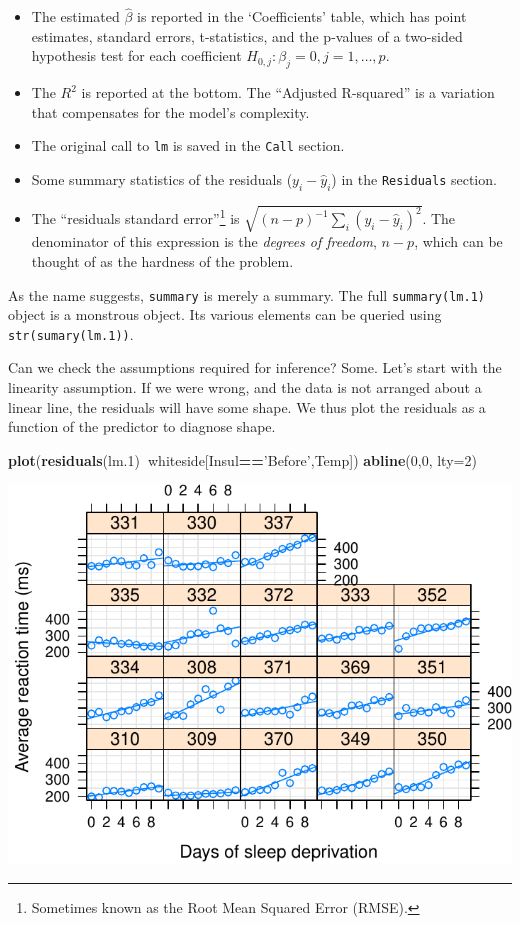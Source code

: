\documentclass[]{book}
\newenvironment{Shaded}{\begin{snugshade}}{\end{snugshade}}
\newcommand{\KeywordTok}[1]{\textcolor[rgb]{0.13,0.29,0.53}{\textbf{#1}}}
\newcommand{\DataTypeTok}[1]{\textcolor[rgb]{0.13,0.29,0.53}{#1}}
\newcommand{\DecValTok}[1]{\textcolor[rgb]{0.00,0.00,0.81}{#1}}
\newcommand{\StringTok}[1]{\textcolor[rgb]{0.31,0.60,0.02}{#1}}
\newcommand{\OperatorTok}[1]{\textcolor[rgb]{0.81,0.36,0.00}{\textbf{#1}}}
\newcommand{\NormalTok}[1]{#1}
\providecommand{\tightlist}{%
  \setlength{\itemsep}{0pt}\setlength{\parskip}{0pt}}
\theoremstyle{definition}
\theoremstyle{definition}
\theoremstyle{definition}
\theoremstyle{remark}
\begin{document}
\begin{itemize}
\tightlist
\item
  The estimated \(\hat \beta\) is reported in the `Coefficients' table,
  which has point estimates, standard errors, t-statistics, and the
  p-values of a two-sided hypothesis test for each coefficient
  \(H_{0,j}:\beta_j=0, j=1,\dots,p\).
\item
  The \(R^2\) is reported at the bottom. The ``Adjusted R-squared'' is a
  variation that compensates for the model's complexity.
\item
  The original call to \texttt{lm} is saved in the \texttt{Call}
  section.
\item
  Some summary statistics of the residuals (\(y_i-\hat y_i\)) in the
  \texttt{Residuals} section.
\item
  The ``residuals standard error''\footnote{Sometimes known as the Root
    Mean Squared Error (RMSE).} is
  \(\sqrt{(n-p)^{-1} \sum_i (y_i-\hat y_i)^2}\). The denominator of this
  expression is the \emph{degrees of freedom}, \(n-p\), which can be
  thought of as the hardness of the problem.
\end{itemize}

As the name suggests, \texttt{summary} is merely a summary. The full
\texttt{summary(lm.1)} object is a monstrous object. Its various
elements can be queried using \texttt{str(sumary(lm.1))}.

Can we check the assumptions required for inference? Some. Let's start
with the linearity assumption. If we were wrong, and the data is not
arranged about a linear line, the residuals will have some shape. We
thus plot the residuals as a function of the predictor to diagnose
shape.

\begin{Shaded}
\begin{Highlighting}[]
\KeywordTok{plot}\NormalTok{(}\KeywordTok{residuals}\NormalTok{(lm.}\DecValTok{1}\NormalTok{)}\OperatorTok{~}\NormalTok{whiteside[Insul}\OperatorTok{==}\StringTok{'Before'}\NormalTok{,Temp])}
\KeywordTok{abline}\NormalTok{(}\DecValTok{0}\NormalTok{,}\DecValTok{0}\NormalTok{, }\DataTypeTok{lty=}\DecValTok{2}\NormalTok{)}
\end{Highlighting}
\end{Shaded}

\includegraphics[width=0.5\linewidth]{Rcourse_files/figure-latex/unnamed-chunk-161-1}
\end{document}
